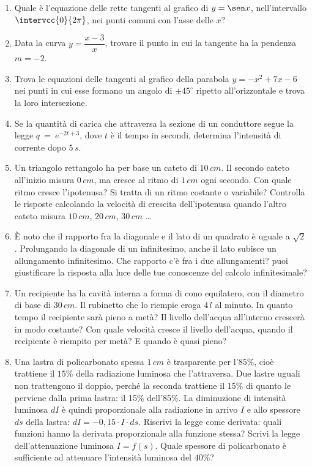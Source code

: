\begin{enumerate}
\item Quale è l'equazione delle rette tangenti al grafico di $y=\sen x$, 
nell'intervallo $\intervcc{0}{2\pi}$, nei punti comuni con l'asse delle $x$?

\item Data la curva $y=\dfrac{x-3}{x}$, trovare il punto in cui la tangente ha 
la pendenza $m=-2$.

\item  Trova le equazioni delle tangenti al grafico della parabola 
$y=-x^2+7x-6$ nei punti in cui esse formano un angolo di $\pm 45^\circ$ 
ripetto all'orizzontale e trova la loro intersezione.

\item Se la quantità di carica che attraversa la sezione di un conduttore
segue la legge $q~=~e^{-2t+3}$, dove $t$ è il tempo in secondi, determina 
l'intensità di corrente dopo $5\,s$.

\item Un triangolo rettangolo ha per base un cateto di $10\, cm$. Il secondo 
cateto all'inizio misura $0\, cm$, ma cresce al ritmo di $1\, cm$ ogni secondo.
Con quale ritmo cresce l'ipotenusa? Si tratta di un ritmo costante o variabile?
Controlla le risposte calcolando la velocità di crescita dell'ipotenusa quando 
l'altro cateto misura $10\, cm$, $20\, cm$, $30\, cm$ \dots

\item È noto che il rapporto fra la diagonale e il lato di un quadrato è uguale 
a $\sqrt{2}$. Prolungando la diagonale di un infinitesimo, anche il lato 
subisce un allungamento infinitesimo. Che rapporto c'è fra i due allungamenti?
puoi giustificare la risposta alla luce delle tue conoscenze del calcolo 
infinitesimale?

\item Un recipiente ha la cavità interna a forma di cono equilatero, con il 
diametro di base di $30\, cm$. Il rubinetto che lo riempie eroga $4\,l$ al 
minuto. In quanto tempo il recipiente sarà pieno a metà? Il livello dell'acqua 
all'interno crescerà in modo costante? Con quale velocità cresce il livello 
dell'acqua, quando il recipiente è riempito per metà? E quando è quasi pieno?

\item Una lastra di policarbonato spessa $1 \,cm$ è trasparente  per l'$85\%$,
cioè trattiene il $15\%$ della radiazione luminosa che l'attraversa. Due lastre
uguali non trattengono il doppio, perché la seconda trattiene il $15\%$ di 
quanto le perviene dalla prima lastra: il 15\% dell'85\%. La diminuzione di
intensità luminosa $dI$ è quindi proporzionale alla radiazione in arrivo $I$
e allo spessore $ds$ della lastra: $dI=-0,15\cdot I\cdot ds$. Riscrivi la legge
come derivata: quali funzioni hanno la derivata proporzionale alla funzione 
stessa? Scrivi la legge dell'attenuazione luminosa $I=f(s)$. Quale spessore di 
policarbonato è sufficiente ad attenuare l'intensità luminosa del $40\%$?



\end{enumerate}
